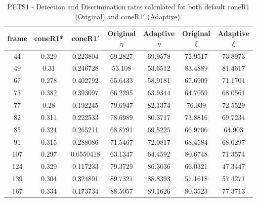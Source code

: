 \begin{appendices}
\begin{table}
\centering
\caption{PETS1 - Detection and Discrimination rates calculated for both default coneR1 (Original) and coneR1$'$ (Adaptive).}
\begin{tabular}{ |c|c|c|c|c|c|c| }
\hline
\textbf{frame} &  \textbf{coneR1*} &  \textbf{coneR1$'$} &  \textbf{Original $\eta$} &  \textbf{Adaptive $\eta$} &  \textbf{Original $\xi$} &  \textbf{Adaptive $\xi$} \\
\hline
\hline
44 &  0.329 &  0.223804 &  69.2827 &  69.9578 &  75.9517 &  73.8973 \\
\hline
49 &  0.31 &  0.246728 &  53.108 &  53.6512 &  83.4889 &  81.4617 \\
\hline
67 &  0.278 &  0.402792 &  65.6433 &  58.9181 &  67.6909 &  71.1704 \\
\hline
73 &  0.382 &  0.393097 &  66.2295 &  63.9344 &  64.7059 &  68.0561 \\
\hline
77 &  0.28 &  0.192245 &  79.6947 &  82.1374 &  76.039 &  72.5529 \\
\hline
82 &  0.311 &  0.222533 &  78.6989 &  80.3717 &  73.8816 &  69.7234 \\
\hline
85 &  0.324 &  0.265211 &  68.8791 &  69.5225 &  66.9706 &  64.903 \\
\hline
91 &  0.315 &  0.288086 &  71.5467 &  72.0817 &  68.4584 &  68.0297 \\
\hline
107 &  0.297 &  0.0550418 &  63.1347 &  64.4592 &  80.6748 &  71.3574 \\
\hline
124 &  0.329 &  0.117233 &  79.3729 &  86.3036 &  66.0321 &  47.3447 \\
\hline
139 &  0.304 &  0.324891 &  89.7321 &  88.8393 &  57.1618 &  57.4271 \\
\hline
167 &  0.334 &  0.173734 &  88.5057 &  89.1626 &  80.3523 &  77.3713 \\
\hline
\end{tabular}


\end{table}
\end{appendices}
